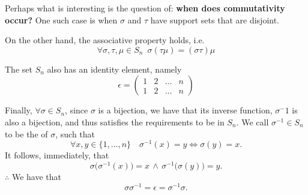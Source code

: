 Perhaps what is interesting is the question of: \textbf{when does commutativity occur?} One such case is when $\sigma$ and $\tau$ have support sets that are disjoint.

On the other hand, the associative property holds, i.e.
\begin{equation*}
  \forall \sigma, \tau, \mu \in S_n \enspace \sigma (\tau \mu) = (\sigma \tau) \mu
\end{equation*}

The set $S_n$ also has an identity element, namely
\begin{equation*}
  \epsilon = \begin{pmatrix}
    1 & 2 & \hdots & n \\
    1 & 2 & \hdots & n
  \end{pmatrix}
\end{equation*}

Finally, $\forall \sigma \in S_n$, since $\sigma$ is a bijection, we have that its inverse function, $\sigma^-1$ is also a bijection, and thus satisfies the requirements to be in $S_n$. We call $\sigma^{-1} \in S_n$ to be the  of $\sigma$, such that
\begin{equation*}
  \forall x, y \in \{1, ..., n\} \quad \sigma^{-1}(x) = y \iff \sigma(y) = x.
\end{equation*}
It follows, immediately, that
\begin{equation*}
  \sigma \big( \sigma^{-1}(x) \big) = x \, \land \, \sigma^{-1} \big( \sigma(y) \big) = y.
\end{equation*}
$\therefore$ We have that 
\begin{equation*}
  \sigma \sigma^{-1} = \epsilon = \sigma^{-1} \sigma.
\end{equation*}

